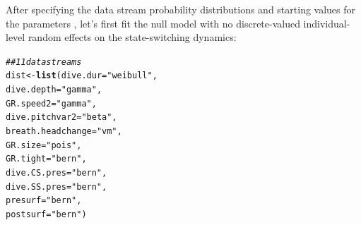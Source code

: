 \documentclass[12pt]{article}\usepackage[]{graphicx}\usepackage[]{color}
\makeatletter
\newcommand{\hlstr}[1]{\textcolor[rgb]{0.192,0.494,0.8}{#1}}%
\newcommand{\hlcom}[1]{\textcolor[rgb]{0.678,0.584,0.686}{\textit{#1}}}%
\newcommand{\hlstd}[1]{\textcolor[rgb]{0.345,0.345,0.345}{#1}}%
\newcommand{\hlkwb}[1]{\textcolor[rgb]{0.69,0.353,0.396}{#1}}%
\newcommand{\hlkwc}[1]{\textcolor[rgb]{0.333,0.667,0.333}{#1}}%
\newcommand{\hlkwd}[1]{\textcolor[rgb]{0.737,0.353,0.396}{\textbf{#1}}}%
\newenvironment{kframe}{%
 \def\at@end@of@kframe{}%
 \ifinner\ifhmode%
  \def\at@end@of@kframe{\end{minipage}}%
  \begin{minipage}{\columnwidth}%
 \fi\fi%
 \def\FrameCommand##1{\hskip\@totalleftmargin \hskip-\fboxsep
 \colorbox{shadecolor}{##1}\hskip-\fboxsep
     \hskip-\linewidth \hskip-\@totalleftmargin \hskip\columnwidth}%
 \MakeFramed {\advance\hsize-\width
   \@totalleftmargin\z@ \linewidth\hsize
   \@setminipage}}%
 {\par\unskip\endMakeFramed%
 \at@end@of@kframe}
\newenvironment{knitrout}{}{} %
\makeatother
\begin{document}
After specifying the data stream probability distributions and starting values for the parameters \citep[based on those reported by ][]{IsojunnoEtAl2017}, let's first fit the null model with no discrete-valued individual-level random effects on the state-switching dynamics:
\begin{knitrout}
\color{fgcolor}\begin{kframe}
\begin{alltt}
\hlcom{## 11 data streams}
\hlstd{dist} \hlkwb{<-} \hlkwd{list}\hlstd{(}\hlkwc{dive.dur} \hlstd{=} \hlstr{"weibull"}\hlstd{,}
             \hlkwc{dive.depth} \hlstd{=} \hlstr{"gamma"}\hlstd{,}
             \hlkwc{GR.speed2} \hlstd{=} \hlstr{"gamma"}\hlstd{,}
             \hlkwc{dive.pitchvar2} \hlstd{=} \hlstr{"beta"}\hlstd{,}
             \hlkwc{breath.headchange} \hlstd{=} \hlstr{"vm"}\hlstd{,}
             \hlkwc{GR.size} \hlstd{=} \hlstr{"pois"}\hlstd{,}
             \hlkwc{GR.tight} \hlstd{=} \hlstr{"bern"}\hlstd{,}
             \hlkwc{dive.CS.pres} \hlstd{=} \hlstr{"bern"}\hlstd{,}
             \hlkwc{dive.SS.pres} \hlstd{=} \hlstr{"bern"}\hlstd{,}
             \hlkwc{presurf} \hlstd{=} \hlstr{"bern"}\hlstd{,}
             \hlkwc{postsurf} \hlstd{=} \hlstr{"bern"}\hlstd{)}


\end{alltt}
\end{kframe}
\end{knitrout}
\end{document}
